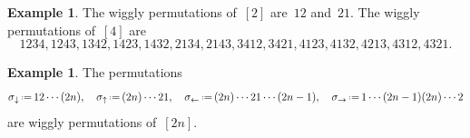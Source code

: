 \documentclass{amsart}
\theoremstyle{definition}
\newtheorem{example}[theorem]{Example}
\newcommand{\eqdef}{\mbox{\,\raisebox{0.2ex}{\scriptsize\ensuremath{\mathrm:}}\ensuremath{=}\,}} %
\begin{document}
\begin{example}
The wiggly permutations of~$[2]$ are~$12$ and~$21$.
The wiggly permutations of~$[4]$ are
\[
1234, 1243, 1342, 1423, 1432, 2134, 2143, 3412, 3421, 4123, 4132, 4213, 4312, 4321.
\]
\end{example}

\begin{example}
\label{exm:specialWigglyPermutations}
The permutations
\[
\sigma_\downarrow \eqdef 1 2 \cdots (2n),
\quad
\sigma_\uparrow \eqdef (2n) \cdots 2 1,
\quad
\sigma_\leftarrow \eqdef (2n) \cdots 2 1 \cdots (2n-1),
\quad
\sigma_\rightarrow \eqdef 1 \cdots (2n-1) (2n) \cdots 2
\]
are wiggly permutations of~$[2n]$.
\end{example}
\end{document}
